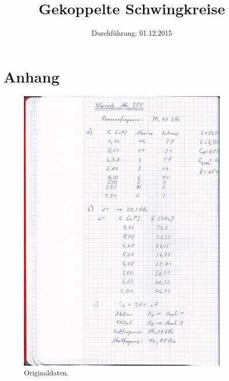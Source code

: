 

\subject{Versuchsprotokoll zum Versuch Nr. 355}
\title{Gekoppelte Schwingkreise}
\date{
  Durchführung: 01.12.2015
}



\maketitle
\newpage






\section{Anhang}
\begin{figure}[H]
  \centering
  \includegraphics[height=14cm]{original.png}
  \caption{Originaldaten.}
  \label{fig:original1}
\end{figure}


\printbibliography


